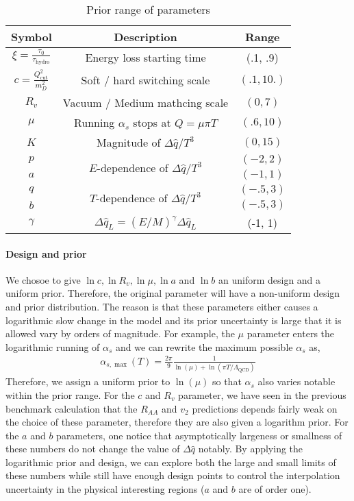 \begin{table}
\centering
\caption{Prior range of parameters}\label{table:new:prior}
\begin{tabular}{ccc}
\hline
Symbol & Description & Range \\
\hline
$\xi = \frac{\tau_0}{\tau_{\textrm{hydro}}}$ & Energy loss starting time & (.1, .9) \\
$c = \frac{Q_{\textrm{cut}}^2}{m_D^2}$ & Soft / hard switching scale & $(.1, 10.)$ \\
$R_v$ & Vacuum / Medium mathcing scale & $(0,7)$\\
$\mu$ & Running $\alpha_s$ stops at $Q = \mu\pi T$ & $(.6, 10)$ \\
$K$ & Magnitude of $\Delta \hat{q}/T^3$ & $(0, 15)$\\ 
$p$ & \multirow{2}{*}{$E$-dependence of $\Delta \hat{q}/T^3$} & $(-2, 2)$\\ 
$a$ &  & $(-1, 1)$\\ 
$q$ & \multirow{2}{*}{$T$-dependence of $\Delta \hat{q}/T^3$}  & $(-.5, 3)$\\ 
$b$ &   & $(-.5, 3)$\\ 
$\gamma$ & $\Delta \hat{q}_L = (E/M)^\gamma\Delta \hat{q}_L$  & (-1, 1)\\ 
\hline
\end{tabular}
\end{table}

\paragraph{Design and prior} 
We chosoe to give $\ln c, \ln R_v, \ln \mu, \ln a$ and $\ln b$ an uniform design and a uniform prior.
Therefore, the original parameter will have a non-uniform design and prior distribution.
The reason is that these parameters either causes a logarithmic slow change in the model and its prior uncertainty is large that it is allowed vary by orders of magnitude.
For example, the $\mu$ parameter enters the logarithmic running of $\alpha_s$ and we can rewrite the maximum possible $\alpha_s$ as,
\begin{eqnarray}
\alpha_{s,\max}(T) = \frac{2\pi}{9}\frac{1}{\ln(\mu) + \ln(\pi T/\Lambda_{\textrm{QCD}})}
\end{eqnarray}
Therefore, we assign a uniform prior to $\ln(\mu)$ so that $\alpha_s$ also varies notable within the prior range.
For the $c$ and $R_v$ parameter, we have seen in the previous benchmark calculation that the $R_{AA}$ and $v_2$ predictions depends fairly weak on the choice of these parameter, therefore they are also given a logarithm prior.
For the $a$ and $b$ parameters, one notice that asymptotically largeness or smallness of these numbers do not change the value of $\Delta \hat{q}$ notably.
By applying the logarithmic prior and design, we can explore both the large and small limits of these numbers while still have enough design points to control the interpolation uncertainty in the physical interesting regions ($a$ and $b$ are of order one). 

